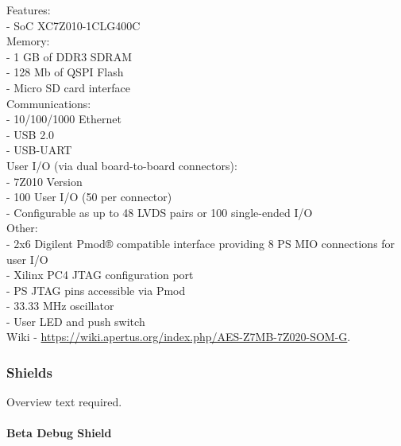 Features:\\


- SoC XC7Z010-1CLG400C\\
    
    
Memory:\\

- 1 GB of DDR3 SDRAM\\
- 128 Mb of QSPI Flash\\
- Micro SD card interface\\


Communications:\\

- 10/100/1000 Ethernet\\
- USB 2.0\\
- USB-UART\\

User I/O (via dual board-to-board connectors):\\

- 7Z010 Version\\
- 100 User I/O (50 per connector)\\
- Configurable as up to 48 LVDS pairs or 100 single-ended I/O\\

Other:\\

- 2x6 Digilent Pmod® compatible interface providing 8 PS MIO connections for user I/O\\
- Xilinx PC4 JTAG configuration port\\
- PS JTAG pins accessible via Pmod\\
- 33.33 MHz oscillator\\
- User LED and push switch\\


Wiki - \href{https://wiki.apertus.org/index.php/AES-Z7MB-7Z020-SOM-G}{https://wiki.apertus.org/index.php/AES-Z7MB-7Z020-SOM-G}.\\







\subsubsection{Shields}

Overview text required.\\

\paragraph{Beta Debug Shield }\\


